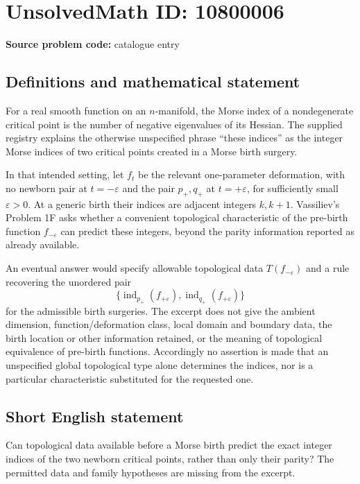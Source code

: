 \documentclass[11pt]{article}
\begin{document}
\section*{UnsolvedMath ID: 10800006}
\textbf{Source problem code:} catalogue entry
\subsection{Definitions and mathematical statement}
For a real smooth function on an $n$-manifold, the Morse index of a nondegenerate critical point is the number of negative eigenvalues of its Hessian. The supplied registry explains the otherwise unspecified phrase ``these indices'' as the integer Morse indices of two critical points created in a Morse birth surgery.

In that intended setting, let $f_t$ be the relevant one-parameter deformation, with no newborn pair at $t=-\varepsilon$ and the pair $p_+,q_+$ at $t=+\varepsilon$, for sufficiently small $\varepsilon>0$. At a generic birth their indices are adjacent integers $k,k+1$. Vassiliev's Problem 1F asks whether a convenient topological characteristic of the pre-birth function $f_{-\varepsilon}$ can predict these integers, beyond the parity information reported as already available.

An eventual answer would specify allowable topological data $T(f_{-\varepsilon})$ and a rule recovering the unordered pair
\[
 \{\operatorname{ind}_{p_+}(f_{+\varepsilon}),
   \operatorname{ind}_{q_+}(f_{+\varepsilon})\}
\]
for the admissible birth surgeries. The excerpt does not give the ambient dimension, function/deformation class, local domain and boundary data, the birth location or other information retained, or the meaning of topological equivalence of pre-birth functions. Accordingly no assertion is made that an unspecified global topological type alone determines the indices, nor is a particular characteristic substituted for the requested one.
\subsection{Short English statement}
Can topological data available before a Morse birth predict the exact integer indices of the two newborn critical points, rather than only their parity? The permitted data and family hypotheses are missing from the excerpt.
\end{document}
